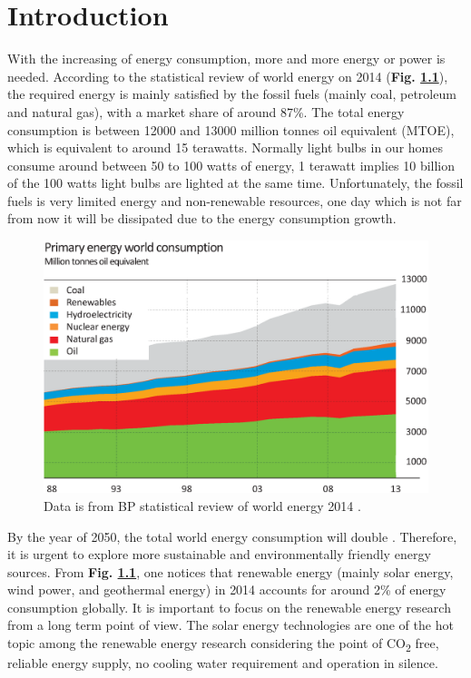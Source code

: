 \documentclass[a4paper, 12pt, titlepage,oneside,drop]{kthesis}
\begin{document}
\newpage
\setcounter{page}{7}
\setcounter{secnumdepth}{3}
\setcounter{tocdepth}{3}
\tableofcontents

\newpage
{}



\chapter{Introduction}

With the increasing of energy consumption, more and more energy or power is needed. According to the statistical review of world energy on 2014 \cite{bp} (\textbf{Fig. \ref{wpec}}),
the required energy is mainly satisfied by the fossil fuels (mainly coal, petroleum and 
natural gas), with a market share of around 87\%. The total energy consumption is between 12000 and 13000 million tonnes oil equivalent (MTOE), which is equivalent to around 15 terawatts. 
Normally light bulbs in our homes consume around between 50 to 100 watts of energy, 1 terawatt implies 10 billion of the 100 watts light bulbs are lighted at the same time. 
Unfortunately, the fossil fuels is very limited energy and non-renewable resources, one day which is not far from  now it will be dissipated due to the energy consumption growth.

\begin{figure}[H]
\centering
\includegraphics[scale=0.4]{energy.eps}
\caption{Data is from BP statistical review of world energy 2014 \cite{bp}.}
\label{wpec}
\end{figure}

By the year of 2050, the total world energy consumption will double \cite{iea}. Therefore, it is urgent to explore more sustainable and environmentally friendly energy sources. From \textbf{Fig. \ref{wpec}},
one notices that renewable energy (mainly solar energy, wind power, and geothermal energy) in 2014 accounts for around 2\% of energy consumption globally. It is important to focus on the renewable energy research from a 
long term point of view. The solar energy technologies are one of the hot topic among the renewable energy research considering the point of CO\textsubscript{2} free, reliable energy supply, no cooling water requirement and
operation in silence.
\end{document}

